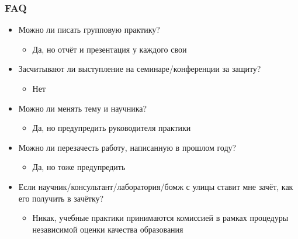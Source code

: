 \documentclass{../../slides-style}
\begin{document}
    \begin{frame}
        \frametitle{FAQ}
        \begin{small}
            \begin{itemize}
                \item Можно ли писать групповую практику?
                \begin{itemize}
                    \item Да, но отчёт и презентация у каждого свои
                \end{itemize}
                \item Засчитывают ли выступление на семинаре/конференции за защиту?
                \begin{itemize}
                    \item Нет
                \end{itemize}
                \item Можно ли менять тему и научника?
                \begin{itemize}
                    \item Да, но предупредить руководителя практики
                \end{itemize}
                \item Можно ли перезачесть работу, написанную в прошлом году?
                \begin{itemize}
                    \item Да, но тоже предупредить
                \end{itemize}
                \item Если научник/консультант/лаборатория/бомж с улицы ставит мне зачёт, как его получить в зачётку?
                \begin{itemize}
                    \item Никак, учебные практики принимаются комиссией в рамках процедуры независимой оценки качества образования
                \end{itemize}
            \end{itemize}
        \end{small}
    \end{frame}
\end{document}
